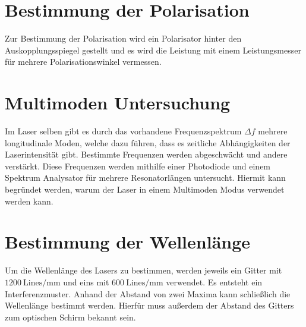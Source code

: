 \section{Bestimmung der Polarisation}
Zur Bestimmung der Polarisation wird ein Polarisator hinter den Auskopplungsspiegel gestellt und es wird die Leistung mit einem Leistungsmesser für mehrere Polarisationswinkel vermessen.

\section{Multimoden Untersuchung}
Im Laser selben gibt es durch das vorhandene Frequenzspektrum $\Delta f$ mehrere longitudinale Moden, welche dazu führen, dass es zeitliche Abhängigkeiten der Laserintensität gibt. Bestimmte Frequenzen werden abgeschwächt und andere verstärkt.
Diese Frequenzen werden mithilfe einer Photodiode und einem Spektrum Analysator für mehrere Resonatorlängen untersucht. Hiermit kann begründet werden, warum der Laser in einem Multimoden Modus verwendet
werden kann.

\section{Bestimmung der Wellenlänge}
Um die Wellenlänge des Lasers zu bestimmen, werden jeweils ein Gitter mit $\qty{1200}{\mathrm{Lines}\per\milli\metre}$ und eins mit $\qty{600}{\mathrm{Lines}\per\milli\metre}$ verwendet. Es entsteht ein Interferenzmuster.
Anhand der Abstand von zwei Maxima kann schließlich die Wellenlänge bestimmt werden. Hierfür muss außerdem der Abstand des Gitters zum optischen Schirm bekannt sein.